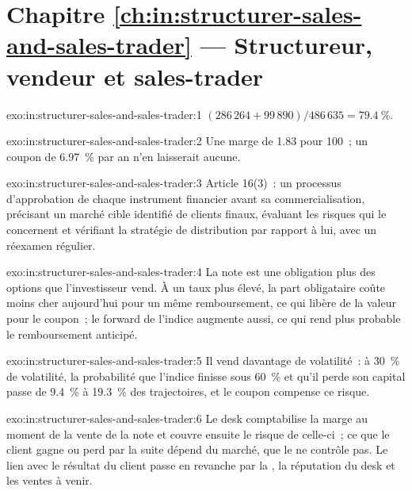\section*{Chapitre \ref{ch:in:structurer-sales-and-sales-trader} --- Structureur, vendeur et sales-trader}

\begin{solution}{exo:in:structurer-sales-and-sales-trader:1}
$(286\,264+99\,890)/486\,635=79.4~\%$.
\end{solution}

\begin{solution}{exo:in:structurer-sales-and-sales-trader:2}
Une marge de 1.83 pour 100~; un coupon de 6.97~\% par an n'en laisserait aucune.
\end{solution}

\begin{solution}{exo:in:structurer-sales-and-sales-trader:3}
Article 16(3)~: un processus d'approbation de chaque instrument financier avant sa commercialisation, précisant un marché cible identifié
de clients finaux, évaluant les risques qui le concernent et vérifiant la stratégie de distribution par rapport à lui, avec un réexamen régulier.
\end{solution}

\begin{solution}{exo:in:structurer-sales-and-sales-trader:4}
La note est une obligation plus des options que l'investisseur vend. À un taux plus élevé, la part obligataire coûte moins cher aujourd'hui pour un même
remboursement, ce qui libère de la valeur pour le coupon~; le forward de l'indice augmente aussi, ce qui rend plus probable le remboursement anticipé.
\end{solution}

\begin{solution}{exo:in:structurer-sales-and-sales-trader:5}
Il vend davantage de volatilité~: à 30~\% de volatilité, la probabilité que l'indice finisse sous 60~\% et qu'il perde son capital passe de 9.4~\% à
19.3~\% des trajectoires, et le coupon compense ce risque.
\end{solution}

\begin{solution}{exo:in:structurer-sales-and-sales-trader:6}
Le desk comptabilise la marge au moment de la vente de la note et couvre ensuite le risque de celle-ci~; ce que le client gagne ou
perd par la suite dépend du marché, que le  ne contrôle pas. Le lien avec le résultat du client passe en revanche
par la , la réputation du desk et les ventes à venir.
\end{solution}

